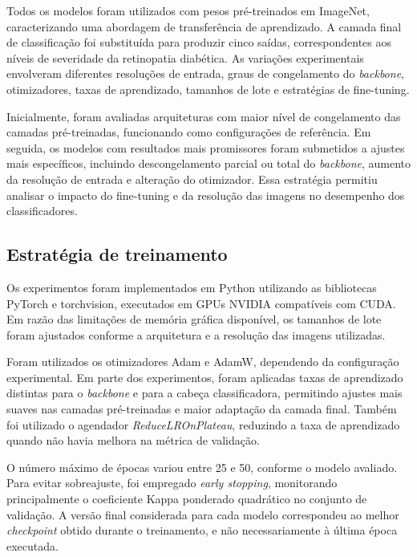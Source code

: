 \documentclass[conference]{IEEEtran}
\begin{document}
Todos os modelos foram utilizados com pesos pr\'e-treinados em ImageNet,
caracterizando uma abordagem de transfer\^encia de aprendizado. A camada
final de classifica\c{c}\~ao foi substitu\'ida para produzir cinco
sa\'idas, correspondentes aos n\'iveis de severidade da retinopatia
diab\'etica. As varia\c{c}\~oes experimentais envolveram diferentes
resolu\c{c}\~oes de entrada, graus de congelamento do \textit{backbone},
otimizadores, taxas de aprendizado, tamanhos de lote e estrat\'egias de
fine-tuning.

Inicialmente, foram avaliadas arquiteturas com maior n\'ivel de
congelamento das camadas pr\'e-treinadas, funcionando como
configura\c{c}\~oes de refer\^encia. Em seguida, os modelos com
resultados mais promissores foram submetidos a ajustes mais espec\'ificos,
incluindo descongelamento parcial ou total do \textit{backbone}, aumento
da resolu\c{c}\~ao de entrada e altera\c{c}\~ao do otimizador. Essa
estrat\'egia permitiu analisar o impacto do fine-tuning e da
resolu\c{c}\~ao das imagens no desempenho dos classificadores.

\subsection{Estrat\'egia de treinamento}

Os experimentos foram implementados em Python utilizando as bibliotecas
PyTorch e torchvision, executados em GPUs NVIDIA compat\'iveis com CUDA.
Em raz\~ao das limita\c{c}\~oes de mem\'oria gr\'afica dispon\'ivel,
os tamanhos de lote foram ajustados conforme a arquitetura e a
resolu\c{c}\~ao das imagens utilizadas.

Foram utilizados os otimizadores Adam e AdamW, dependendo da
configura\c{c}\~ao experimental. Em parte dos experimentos, foram
aplicadas taxas de aprendizado distintas para o \textit{backbone} e
para a cabe\c{c}a classificadora, permitindo ajustes mais suaves nas
camadas pr\'e-treinadas e maior adapta\c{c}\~ao da camada final. Tamb\'em
foi utilizado o agendador \textit{ReduceLROnPlateau}, reduzindo a taxa de
aprendizado quando n\~ao havia melhora na m\'etrica de valida\c{c}\~ao.

O n\'umero m\'aximo de \'epocas variou entre 25 e 50, conforme o modelo
avaliado. Para evitar sobreajuste, foi empregado \textit{early stopping},
monitorando principalmente o coeficiente Kappa ponderado quadr\'atico no
conjunto de valida\c{c}\~ao. A vers\~ao final considerada para cada
modelo correspondeu ao melhor \textit{checkpoint} obtido durante o
treinamento, e n\~ao necessariamente \`a \'ultima \'epoca executada.
\end{document}
